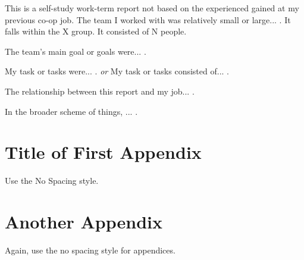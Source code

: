 \documentclass{wkrpt}
\begin{document}
\nocite{*}
\printbibliography[heading=none] %


\contributions

This is a self-study work-term report not based on the experienced gained at my previous co-op job.  The team I worked with was relatively small or large... .  It falls within the X group.  It consisted of N people.

The team's main goal or goals were... .

My task or tasks were... .  \emph{or}  My task or tasks consisted of... .

The relationship between this report and my job... .

In the broader scheme of things, ... .


\appendix

\section{Title of First Appendix}
\label{app:firstappx}
Use the No Spacing style.

\section{Another Appendix}
\label{app:anotherappx}
Again, use the no spacing style for appendices.
\end{document}
